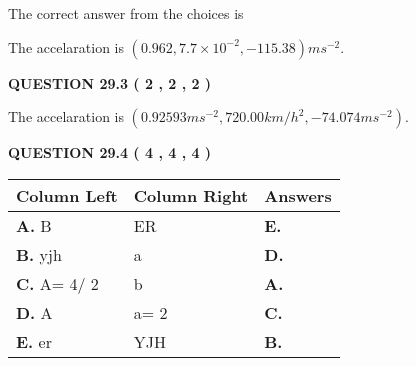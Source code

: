 \documentclass[12pt]{article}
\begin{document}
 
 
 
 
 
\noindent{}

The correct answer from the choices is


The accelaration is $  %
(
0.962,
7.7 \times 10^{-2},
-115.38)
ms^{-2} $.
 
 
 
  
\vspace{0.2in}
  
{\textbf{\Large{QUESTION
29.3 
 (           2 ,           2 ,           2 )
}}}
  
  
 
 
\noindent{}
 
 
The accelaration is
$(
0.92593ms^{-2},
720.00km/h^2,
-74.074ms^{-2}
).
$
 
 
 
 
  
\vspace{0.2in}
  
{\textbf{\Large{QUESTION
29.4 
 (           4 ,           4 ,           4 )
}}}
  
  
 
 
\noindent{}
  
  
\begin{tabular}{|l|l|l|}
 \hline
 Column Left & Column Right  & Answers       \\ 
 \hline
{\textbf{\large{
A.}}}
B
  & 
ER
 & 
{\textbf{\large{
E.}}}
 \\ 
 \hline
{\textbf{\large{
B.}}}
yjh
  & 
a
 & 
{\textbf{\large{
D.}}}
 \\ 
 \hline
{\textbf{\large{
C.}}}
 A= %
4/ %
2

  & 
b
 & 
{\textbf{\large{
A.}}}
 \\ 
 \hline
{\textbf{\large{
D.}}}
A
  & 
 a= %
2
 & 
{\textbf{\large{
C.}}}
 \\ 
 \hline
{\textbf{\large{
E.}}}
er
  & 
YJH
 & 
{\textbf{\large{
B.}}}
 \\ 
 \hline
 \end{tabular}
  
  
 
 
 
 
  
\vspace{0.2in}
  
\end{document}
